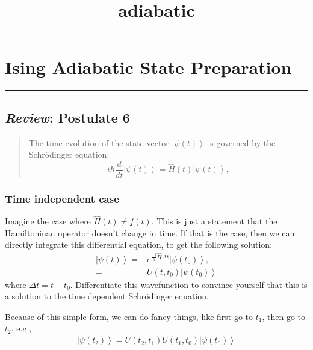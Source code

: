 \documentclass[11pt]{article}
\title{adiabatic}
\providecommand{\ket}[1]{\left|#1\right\rangle}
\begin{document}
    
    \maketitle
    
    

    
    \section{Ising Adiabatic State
Preparation}\label{ising-adiabatic-state-preparation}

\begin{center}\rule{0.5\linewidth}{0.5pt}\end{center}

\subsection{\texorpdfstring{\emph{Review}: Postulate
6}{Review: Postulate 6}}\label{review-postulate-6}

\begin{quote}
The time evolution of the state vector \(\ket{\psi(t)}\) is governed by
the Schrödinger equation:
\[      i\hbar\frac{d}{dt}\ket{\psi(t)} = \hat{H}(t)\ket{\psi(t)},\]
\end{quote}

\subsubsection{Time independent case}\label{time-independent-case}

Imagine the case where \(\hat{H}(t) \neq f(t)\). This is just a
statement that the Hamiltoninan operator doesn't change in time. If that
is the case, then we can directly integrate this differential equation,
to get the following solution: \[\begin{align}
\ket{\psi(t)} =& e^{\frac{-i}{\hbar}\hat{H}\Delta t}\ket{\psi(t_0)}, \\
=& U(t,t_0)\ket{\psi(t_0)}
\end{align}
\] where \(\Delta t = t-t_0\). Differentiate this wavefunction to
convince yourself that this is a solution to the time dependent
Schrödinger equation.

Because of this simple form, we can do fancy things, like first go to
\(t_1\), then go to \(t_2\), e.g., \[\begin{align}
\ket{\psi(t_2)} = U(t_2,t_1)U(t_1,t_0)\ket{\psi(t_0)}
\end{align}
\]
\end{document}
